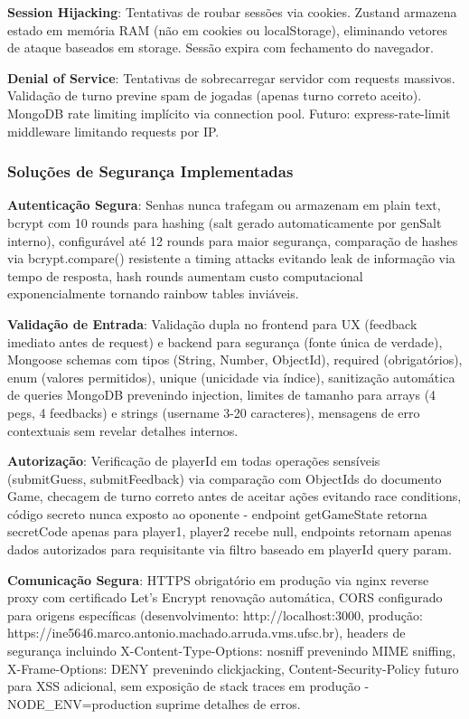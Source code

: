 \documentclass[conference]{IEEEtran}
\begin{document}
\textbf{Session Hijacking}: Tentativas de roubar sessões via cookies. Zustand armazena estado em memória RAM (não em cookies ou localStorage), eliminando vetores de ataque baseados em storage. Sessão expira com fechamento do navegador.

\textbf{Denial of Service}: Tentativas de sobrecarregar servidor com requests massivos. Validação de turno previne spam de jogadas (apenas turno correto aceito). MongoDB rate limiting implícito via connection pool. Futuro: express-rate-limit middleware limitando requests por IP.

\subsubsection{Soluções de Segurança Implementadas}

\textbf{Autenticação Segura}: Senhas nunca trafegam ou armazenam em plain text, bcrypt \cite{bcrypt:2024} com 10 rounds para hashing (salt gerado automaticamente por genSalt interno), configurável até 12 rounds para maior segurança, comparação de hashes via bcrypt.compare() resistente a timing attacks evitando leak de informação via tempo de resposta, hash rounds aumentam custo computacional exponencialmente tornando rainbow tables inviáveis.

\textbf{Validação de Entrada}: Validação dupla no frontend para UX (feedback imediato antes de request) e backend para segurança (fonte única de verdade), Mongoose \cite{mongodb:2024} schemas com tipos (String, Number, ObjectId), required (obrigatórios), enum (valores permitidos), unique (unicidade via índice), sanitização automática de queries MongoDB prevenindo injection, limites de tamanho para arrays (4 pegs, 4 feedbacks) e strings (username 3-20 caracteres), mensagens de erro contextuais sem revelar detalhes internos.

\textbf{Autorização}: Verificação de playerId em todas operações sensíveis (submitGuess, submitFeedback) via comparação com ObjectIds do documento Game, checagem de turno correto antes de aceitar ações evitando race conditions, código secreto nunca exposto ao oponente - endpoint getGameState retorna secretCode apenas para player1, player2 recebe null, endpoints retornam apenas dados autorizados para requisitante via filtro baseado em playerId query param.

\textbf{Comunicação Segura}: HTTPS obrigatório em produção via nginx reverse proxy com certificado Let's Encrypt renovação automática, CORS configurado para origens específicas (desenvolvimento: http://localhost:3000, produção: https://ine5646.marco.antonio.machado.arruda.vms.ufsc.br), headers de segurança incluindo X-Content-Type-Options: nosniff prevenindo MIME sniffing, X-Frame-Options: DENY prevenindo clickjacking, Content-Security-Policy futuro para XSS adicional, sem exposição de stack traces em produção - NODE\_ENV=production suprime detalhes de erros.
\end{document}
